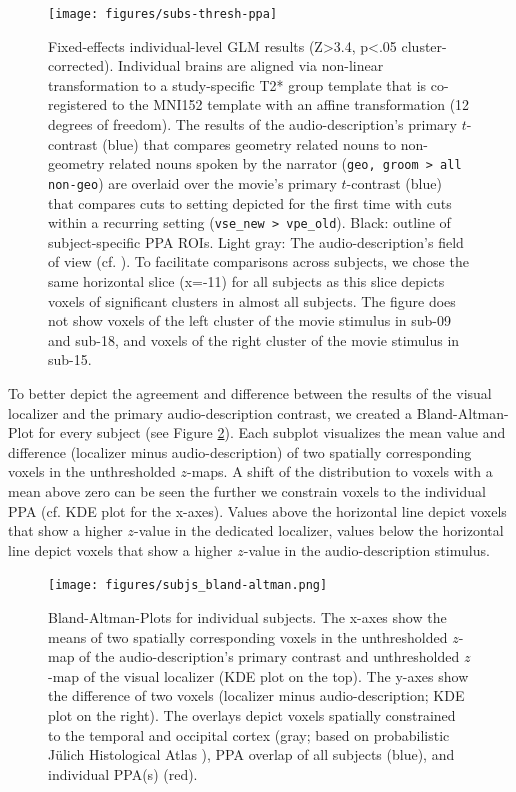 \documentclass[english]{article}
\begin{document}
\begin{figure}[h!]
\centering
    \texttt{[image: figures/subs-thresh-ppa]}
    \caption{Fixed-effects individual-level GLM results (Z>3.4, p<.05
        cluster-corrected).
        Individual brains are aligned via non-linear
        transformation to a study-specific T2* group template that is
        co-registered to the MNI152 template with an affine transformation (12
        degrees of freedom).
        The results of the audio-description's primary
        $t$-contrast (blue) that compares geometry related nouns to non-
        geometry related nouns spoken by the narrator
        (\texttt{geo, groom > all non-geo}) are overlaid over the movie's
        primary $t$-contrast (blue) that compares cuts to setting depicted for
        the first time with cuts within a recurring setting
        (\texttt{vse\_new > vpe\_old}).
        Black:
        outline of subject-specific PPA ROIs.
        Light gray: The
        audio-description's field of view (cf. \citep{hanke2014audiomovie}).
        To facilitate comparisons across subjects, we chose the same horizontal
        slice (x=-11) for all subjects as this slice depicts voxels of
        significant clusters in almost all subjects.
        The figure does not show voxels of the left cluster of the movie stimulus
        in sub-09 and sub-18, and voxels of the right cluster of the movie
        stimulus in sub-15.}
    \label{fig:subs-thresh-ppa}
\end{figure}

To better depict the agreement and difference between the results of the visual
localizer and the primary audio-description contrast, we created a Bland-Altman-Plot for every
subject (see Figure \ref{fig:bland-altman}).
Each subplot visualizes the mean value and difference (localizer minus audio-description) of
two spatially corresponding voxels in the unthresholded $z$-maps.
A shift of the distribution to voxels with a mean above zero can be seen the
further we constrain voxels to the individual PPA (cf. KDE plot for the x-axes).
Values above the horizontal line depict voxels that show a higher $z$-value in
the dedicated localizer, values below the horizontal line depict voxels that
show a higher $z$-value in the audio-description stimulus.

\begin{figure}[h!]
\centering
    \texttt{[image: figures/subjs\_bland-altman.png]}
    \caption{Bland-Altman-Plots for individual subjects.
    The x-axes show the means of two spatially corresponding voxels in the
    unthresholded $z$-map of the audio-description's primary contrast and
    unthresholded $z$-map of the visual localizer (KDE plot on the top).
    The y-axes show the difference of two voxels (localizer minus
    audio-description; KDE plot on the right).
    The overlays depict voxels spatially constrained to the
    temporal and occipital cortex (gray; based on probabilistic Jülich
    Histological Atlas \citep{eickhoff2005toolbox, eickhoff2007assignment}),
    PPA overlap of all subjects (blue),
    and individual PPA(s) (red).}
    \label{fig:bland-altman}
\end{figure}
\end{document}
